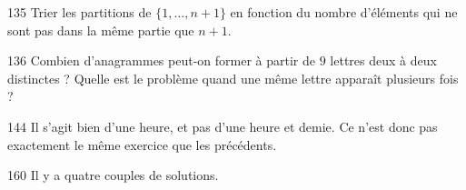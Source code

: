 \begin{Hint}{135}
Trier les partitions de $\{1, \dots, n+1\}$ en fonction du nombre d'éléments qui ne sont pas dans la même partie que $n+1$.
\end{Hint}
\begin{Hint}{136}
Combien d'anagrammes peut-on former à partir de $9$ lettres deux à deux distinctes ? Quelle est le problème quand une même lettre apparaît plusieurs fois ?
\end{Hint}
\begin{Hint}{144}
Il s'agit bien d'une heure, et pas d'une heure et demie. Ce n'est donc pas exactement le même exercice que les précédents.
\end{Hint}
\begin{Hint}{160}
Il y a quatre couples de solutions.
\end{Hint}
